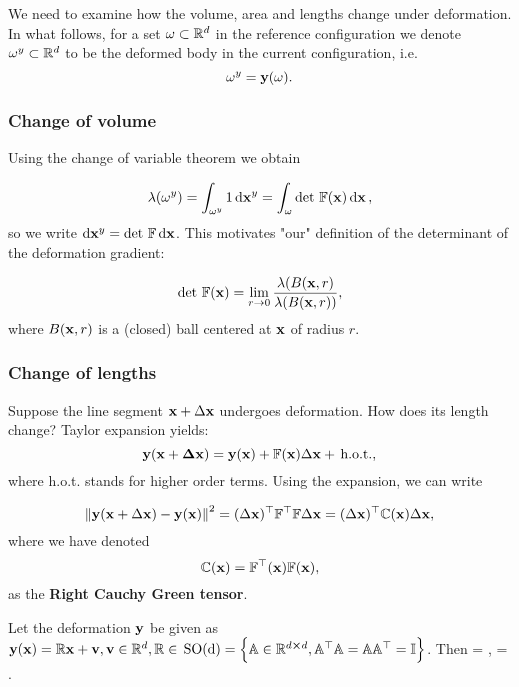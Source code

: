\documentclass[reqno, a4paper]{article}
\begin{document}
We need to examine how the volume, area and lengths change under deformation. In what follows, for a set $\omega \subset {\mathbb R}^d$ in the reference configuration we denote $\omega^y \subset {\mathbb R}^d$ to be the deformed body in the current configuration, i.e.
\[
	\omega^y = \vb{y}(\omega).
\]

\subsubsection{Change of volume}
\label{sec:Change of volume}
Using the change of variable theorem we obtain

\begin{equation*}
	\lambda(\omega^y) = \int_{\omega^y} 1 \dd{\vb{x}^y} = \int_\omega \det\, \mathbb{F}(\vb{x}) \dd{\vb{x}},
\end{equation*}
so we write $\dd{\vb{x}^y} = \det\, \mathbb{F} \dd{\vb{x}}$. This motivates "our" definition of the determinant of the deformation gradient:

\begin{equation}
\label{eq:detfdefinition}
	\det\, \mathbb{F} (\vb{x}) = \lim_{r\to 0} \frac{\lambda(B(\vb{x},r)}{\lambda(B(\vb{x},r))},
\end{equation}
where $B(\vb{x},r)$ is a (closed) ball centered at $\vb{x}$ of radius $r$.

\subsubsection{Change of lengths}
\label{sec:chlengths}
Suppose the line segment $\vb{x}+\Delta \vb{x}$ undergoes deformation. How does its length change?
Taylor expansion yields:
\begin{equation*}
	\vb{y}(\vb{x}+\vb{\Delta x})= \vb{y}(\vb{x}) + \mathbb{F}(\vb{x})\Delta \vb{x} + \, \text{h.o.t.},
\end{equation*}
where h.o.t. stands for higher order terms. Using the expansion, we can write

\[
	\norm{\vb{y}(\vb{x}+\Delta \vb{x}) - \vb{y}(\vb{x})}^2 = (\Delta \vb{x})^\top \mathbb{F}^\top \mathbb{F} \Delta \vb{x} = 
	(\Delta \vb{x})^\top \mathbb{C}(\vb{x}) \Delta \vb{x},
\]
where we have denoted
\[
	\mathbb{C}(\vb{x}) = \mathbb{F}^\top(\vb{x})\mathbb{F}(\vb{x}),
\]
as the \textbf{Right Cauchy Green tensor}. 

\begin{example}
	Let the deformation $\vb{y}$ be given as $\vb{y}(\vb{x}) = \mathbb{R} \vb{x}+ \vb{v}, \vb{v} \in {\mathbb R}^d, \mathbb{R} \in \, \text{SO(d)} = \Big\{\mathbb{A} \in {\mathbb R}^{d \cross d}, \mathbb{A}^\top \mathbb{A} = \mathbb{A} \mathbb{A}^\top = \mathbb{I}\Big\}$.
	Then \fgrad = , \rcg = \identity.
\end{example}
\end{document}
